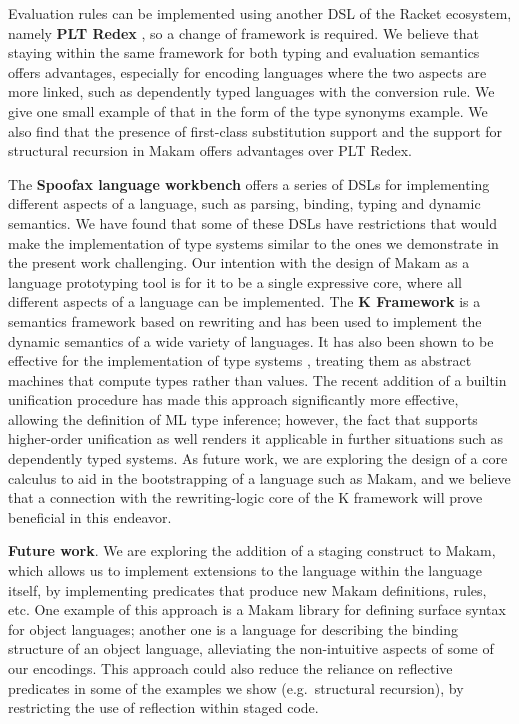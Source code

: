 Evaluation rules can be implemented using another DSL of the Racket
ecosystem, namely \textbf{PLT Redex} \citep{felleisen2009semantics}, so
a change of framework is required. We believe that staying within the
same framework for both typing and evaluation semantics offers
advantages, especially for encoding languages where the two aspects are
more linked, such as dependently typed languages with the conversion
rule. We give one small example of that in the form of the type synonyms
example. We also find that the presence of first-class substitution
support and the support for structural recursion in Makam offers
advantages over PLT Redex.

The \textbf{Spoofax language workbench} \citep{spoofax-main-reference}
offers a series of DSLs for implementing different aspects of a
language, such as parsing, binding, typing and dynamic semantics. We
have found that some of these DSLs have restrictions that would make the
implementation of type systems similar to the ones we demonstrate in the
present work challenging. Our intention with the design of Makam as a
language prototyping tool is for it to be a single expressive core,
where all different aspects of a language can be implemented. The
\textbf{K Framework} \citep{k-framework-main-reference} is a semantics
framework based on rewriting and has been used to implement the dynamic
semantics of a wide variety of languages. It has also been shown to be
effective for the implementation of type systems
\citep{k-framework-type-systems}, treating them as abstract machines
that compute types rather than values. The recent addition of a builtin
unification procedure has made this approach significantly more
effective, allowing the definition of ML type inference; however, the
fact that \lamprolog supports higher-order unification as well renders
it applicable in further situations such as dependently typed systems.
As future work, we are exploring the design of a core calculus to aid in
the bootstrapping of a language such as Makam, and we believe that a
connection with the rewriting-logic core of the K framework will prove
beneficial in this endeavor.

\textbf{Future work}. We are exploring the addition of a staging
construct to Makam, which allows us to implement extensions to the
language within the language itself, by implementing predicates that
produce new Makam definitions, rules, etc. One example of this approach
is a Makam library for defining surface syntax for object languages;
another one is a language for describing the binding structure of an
object language, alleviating the non-intuitive aspects of some of our
encodings. This approach could also reduce the reliance on reflective
predicates in some of the examples we show (e.g.~structural recursion),
by restricting the use of reflection within staged code.
